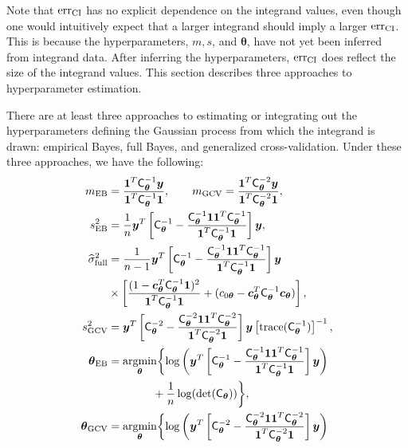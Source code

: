 \documentclass[twocolumn]{svjour3}          %
\newcommand{\bm}[1]{\boldsymbol{#1}}
\newcommand{\trace}[1]{\textup{trace}{#1}}
\newcommand{\vtheta}{{\bm{\theta}}}
\newcommand{\vc}{\bm{c}}
\newcommand{\vy}{\bm{y}}
\newcommand{\vone}{\bm{1}}
\newcommand{\mC}{\mathsf{C}}
\newcommand{\mCInv}{\mathsf{C}^{-1}}
\newcommand{\hsigma}{\widehat{\sigma}}
\newcommand{\MLE}{\textup{EB}}
\newcommand{\full}{\textup{full}}
\newcommand{\GCV}{\textup{GCV}}
\newcommand{\err}{\textup{err}}
\providecommand{\argmin}{\operatorname*{argmin}}
\begin{document}
Note that $\err_{\textup{CI}}$ has no explicit dependence on the integrand values, even though one would intuitively expect that a larger integrand should imply a  larger $\err_{\textup{CI}}$.  This is because the hyperparameters, $m, s$, and $\vtheta$, have not yet been inferred from integrand data.  After inferring the hyperparameters, $\err_{\textup{CI}}$ does reflect the size of the integrand values. This section describes three approaches to hyperparameter estimation.

\begin{theorem} \label{thm:param} There are at least three approaches to estimating or integrating out the hyperparameters defining the Gaussian process from which the integrand is drawn: empirical Bayes, full Bayes, and generalized cross-\linebreak[4]validation.  Under these three approaches, we have the following:
\begin{align}
    \label{eqn_m_MLE}
m_\MLE &= \frac{\vone^T \mCInv_\vtheta \vy }{ \vone^T \mCInv_\vtheta \vone}, \qquad
m_{\textup{GCV}} = \frac{\vone^T \mC_\vtheta^{-2} \vy}{\vone^T \mC_\vtheta^{-2} \vone}, \\
\label{eqn_s2_MLE}
s^2_{\MLE} 
&= 
\frac{1}{n}
\vy^T 
\left[ \mCInv_\vtheta - 
\frac{ \mCInv_\vtheta \vone \vone^T \mCInv_\vtheta }{\vone^T\mCInv_\vtheta \vone}
\right] \vy, \\
\nonumber
\hsigma_{\full}^2 
& = \frac{1}{n-1}
\vy^T\left[ \mC_\vtheta^{-1} 
- \frac{ \mC_\vtheta^{-1} \vone\vone^T \mC_\vtheta^{-1}}{\vone^T \mC_\vtheta^{-1} \vone}  \right]\vy
\\ 
\label{eqn:sigma2_full}
& \times  \left[\frac{(1 - \vc_{\vtheta}^T \mC_\vtheta^{-1} \vone)^2}{\vone^T \mC_\vtheta^{-1} \vone} + (c_{0\vtheta}  -\vc_{\vtheta} ^T \mC_\vtheta^{-1} \vc_{\vtheta}) \right], \\
\nonumber
 s^2_{\textup{GCV}} & = \vy^T \left[\mC_\vtheta^{-2} - \frac{\mC_\vtheta^{-2} \vone \vone^T \mC_\vtheta^{-2}}{\vone^T \mC_\vtheta^{-2} \vone}  \right] \vy  \left[ \trace(\mC_\vtheta^{-1}) \right]^{-1}, \\
\nonumber
\vtheta_\MLE
&= \argmin_{\vtheta} \biggl \{
\log\left(\vy^T 
\left[ \mC_\vtheta^{-1} - 
\frac{ \mCInv_\vtheta \vone \vone^T \mCInv_\vtheta }{\vone^T\mCInv_\vtheta \vone}
\right] \vy 
\right)  \\
\label{eqn:thetaMLE}
 & \qquad \qquad +  \frac{1}{n} \log(\det(\mC_\vtheta))
\biggr \}, \\
\nonumber
\vtheta_{\GCV} &= \argmin_\vtheta \biggl\{\log \left(  \vy^T \left[\mC^{-2}_\vtheta - \frac{\mC^{-2}_\vtheta \vone \vone^T \mC^{-2}_\vtheta}{\vone^T \mC^{-2}_\vtheta \vone}  \right] \vy \right)  \\

\end{align}
\end{theorem}
\end{document}
